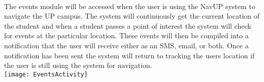 \documentclass{article}
\begin{document}
\paragraph{} The events module will be accessed when the user is using the NavUP system to navigate the UP campus. The system will continuously get the current location of the student and when a student passes a point of interest the system will check for events at the particular location. These events will then be compiled into a notification that the user will receive either as an SMS, email, or both. Once a notification has been sent the system will return to tracking the users location if the user is still using the system for navigation.\\
\newline
\texttt{[image: EventsActivity]}
\end{document}
